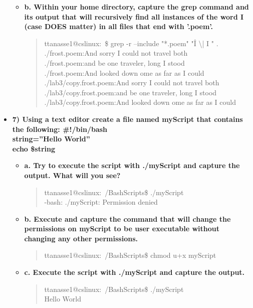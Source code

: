 \documentclass{article}
\begin{document}
\begin{itemize}
\begin{itemize}
\begin{quote}
    \end{quote}
    \item \textbf{b. Within your home directory, capture the grep command and its output that will recursively find all instances of the word I (case DOES matter) in all files that end with '.poem'.}
    \begin{quote}
ttanasse1@cslinux:~\$ grep -r --include "*.poem" "\^I \textbackslash| I " .\\
./frost.poem:And sorry I could not travel both\\
./frost.poem:and be one traveler, long I stood\\
./frost.poem:And looked down ome as far as I could\\
./lab3/copy.frost.poem:And sorry I could not travel both\\
./lab3/copy.frost.poem:and be one traveler, long I stood\\
./lab3/copy.frost.poem:And looked down ome as far as I could\\
    \end{quote}
  \end{itemize}
  \item \textbf{7)  Using a text editor create a file named myScript that contains the following:
\#!/bin/bash\\
string=”Hello World”\\
echo \$string}
  \begin{itemize}
    \item \textbf{a. Try to execute the script with   ./myScript   and capture the output. What  will you see?}
    \begin{quote}
    ttanasse1@cslinux:~/BashScripts\$ ./myScript\\
-bash: ./myScript: Permission denied
    \end{quote}
    \item \textbf{b. Execute and capture the command that will change the permissions on myScript to be user executable without changing any other permissions.}
    \begin{quote}
    ttanasse1@cslinux:~/BashScripts\$ chmod u+x myScript 
    \end{quote}
    \item \textbf{c. Execute the script with ./myScript and capture the output.}
    \begin{quote}
    ttanasse1@cslinux:~/BashScripts\$ ./myScript\\
Hello World
    \end{quote}
  \end{itemize}

\end{itemize}
\end{document}

